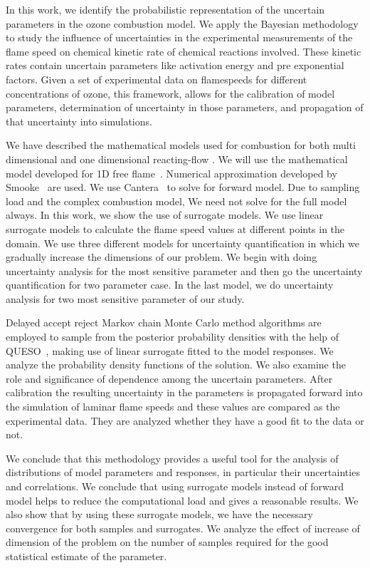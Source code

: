 

In this work, we identify the probabilistic representation of the uncertain parameters in the ozone combustion model. We  apply the Bayesian methodology to study the influence of
uncertainties in the experimental measurements of the flame speed on chemical kinetic rate of chemical reactions involved. These kinetic rates contain uncertain parameters like activation energy and pre exponential factors. Given a set of experimental data on flamespeeds for different concentrations of ozone, this framework, allows for the
calibration of model parameters, determination of uncertainty in those parameters, and propagation
of that uncertainty into simulations.

\bigskip

We have described the mathematical models used for combustion for both multi dimensional and one dimensional reacting-flow . We will use the mathematical model developed for 1D free flame~\cite{Kuo}. Numerical approximation developed by Smooke~\cite{Smooke} are used. We use Cantera~\cite{Cantera} to solve for forward model. Due to sampling load and the complex combustion model, We need not solve for the full model always. In this work, we show the use of surrogate models. We use linear surrogate models to calculate the flame speed values at different points in the domain. We use three different models for uncertainty quantification in which we gradually increase the dimensions of our problem. We begin with doing uncertainty analysis for the most sensitive parameter and then go the uncertainty quantification for two parameter case. In the last model, we do uncertainty analysis for two most sensitive parameter of our study.  


\bigskip


Delayed accept reject Markov chain Monte Carlo method 
algorithms are employed to sample from the posterior probability densities with the help of QUESO~\cite{QUESO}, making use of
linear surrogate fitted to the model responses. We analyze the  probability density functions of the solution. We
also examine the role and significance of dependence among the uncertain parameters. After calibration the resulting uncertainty in the parameters is propagated forward into
the simulation of laminar flame speeds and these values are compared as the experimental data. They are analyzed whether they have a good fit to the data or not. 


\bigskip



We conclude that this methodology provides a useful tool for the analysis of distributions of model parameters and
responses, in particular their uncertainties and correlations. We conclude that using surrogate models instead of forward model helps to reduce the computational load and gives a reasonable results. We also show that by using these surrogate models, we have the necessary convergence for both samples and surrogates. We analyze the effect of increase of dimension of the problem on the number of samples required for the good statistical estimate of the parameter. 

